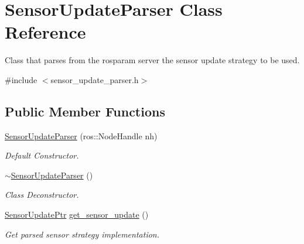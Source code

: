 \hypertarget{classSensorUpdateParser}{\section{Sensor\-Update\-Parser Class Reference}
\label{classSensorUpdateParser}
}


Class that parses from the rosparam server the sensor update strategy to be used.  




{\ttfamily \#include $<$sensor\-\_\-update\-\_\-parser.\-h$>$}

\subsection*{Public Member Functions}
\begin{DoxyCompactItemize}
\item 
\hypertarget{classSensorUpdateParser_a75485f13f3fc802a94c5246c05367e7b}{\hyperlink{classSensorUpdateParser_a75485f13f3fc802a94c5246c05367e7b}{Sensor\-Update\-Parser} (ros\-::\-Node\-Handle nh)}\label{classSensorUpdateParser_a75485f13f3fc802a94c5246c05367e7b}

\begin{DoxyCompactList}\small\item\em Default Constructor. \end{DoxyCompactList}\item 
\hypertarget{classSensorUpdateParser_a8da82b578ce394108d4fef03ef8bbd6c}{\hyperlink{classSensorUpdateParser_a8da82b578ce394108d4fef03ef8bbd6c}{$\sim$\-Sensor\-Update\-Parser} ()}\label{classSensorUpdateParser_a8da82b578ce394108d4fef03ef8bbd6c}

\begin{DoxyCompactList}\small\item\em Class Deconstructor. \end{DoxyCompactList}\item 
\hypertarget{classSensorUpdateParser_a5513b406355330377c64825c30264e44}{\hyperlink{sensor__update_8h_a7bfe6ec1a05f2f99b0974d5cbd8b8b7b}{Sensor\-Update\-Ptr} \hyperlink{classSensorUpdateParser_a5513b406355330377c64825c30264e44}{get\-\_\-sensor\-\_\-update} ()}\label{classSensorUpdateParser_a5513b406355330377c64825c30264e44}

\begin{DoxyCompactList}\small\item\em Get parsed sensor strategy implementation. \end{DoxyCompactList}\end{DoxyCompactItemize}


